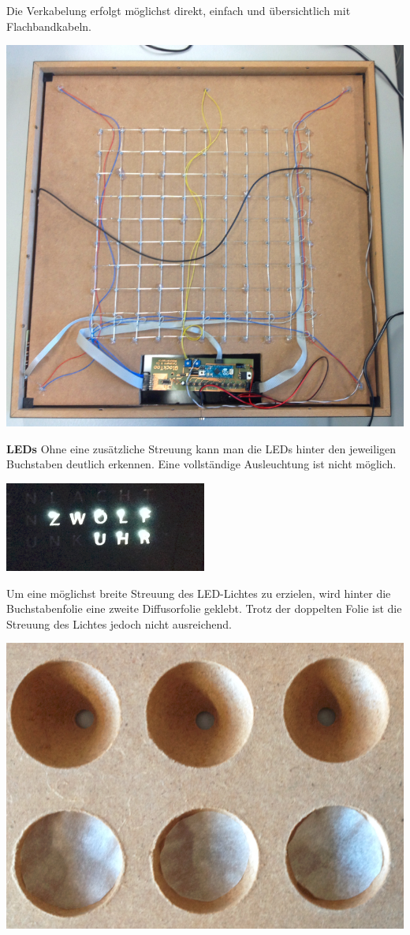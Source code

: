 \begin{multicols}{2}
{}
Die Verkabelung erfolgt möglichst direkt, einfach und übersichtlich mit Flachbandkabeln.

{
\centering
\includegraphics[width=0.85\columnwidth]{Abbildungen/Konstruktion/Platte04}

}

\textbf{LEDs} Ohne eine zusätzliche Streuung kann man die LEDs hinter den jeweiligen Buchstaben deutlich erkennen. Eine vollständige Ausleuchtung ist nicht möglich.

{
\centering
\includegraphics[width=0.85\columnwidth]{Abbildungen/Konstruktion/LED03}

}
Um eine möglichst breite Streuung des LED-Lichtes zu erzielen, wird hinter die Buchstabenfolie eine zweite Diffusorfolie  geklebt. Trotz der doppelten Folie ist die Streuung des Lichtes jedoch nicht ausreichend.

{
\centering
\includegraphics[width=0.6\columnwidth]{Abbildungen/Konstruktion/Diffusor01}

}
\end{multicols}
